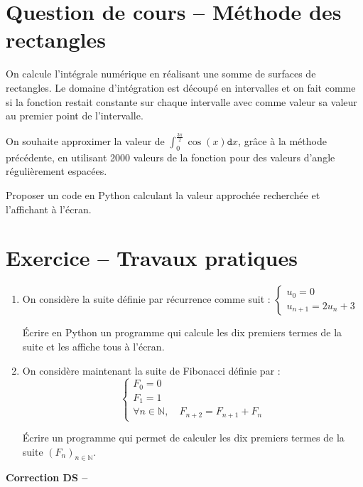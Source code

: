 \section{Question de cours -- Méthode des rectangles}

On calcule l'intégrale numérique en réalisant une somme de surfaces de rectangles. Le domaine d'intégration est découpé en intervalles et on fait comme si la fonction restait constante sur chaque intervalle avec comme valeur sa valeur au premier point de l'intervalle.

On souhaite approximer la valeur de $\displaystyle \int_0^\frac{3\pi}{2} \cos(x)\mathtt{d}x$, grâce à la méthode précédente, en utilisant 2000 valeurs de la fonction pour des valeurs d'angle régulièrement espacées.

Proposer un code en Python calculant la valeur approchée recherchée et l'affichant à l'écran.

\newpage 

\section{Exercice -- Travaux pratiques}

\begin{enumerate}
\item  On considère la suite définie par récurrence comme suit :
$\left\lbrace\begin{array}{l}
u_0=0\\
u_{n+1}=2u_n+3
\end{array}\right.$

Écrire en Python un programme qui calcule les dix premiers termes de la suite et les affiche tous à l'écran.

\item On considère maintenant la suite de Fibonacci définie par :
\[\left\lbrace\begin{array}{l}
F_0=0\\
F_1=1\\
\forall n\in\mathbb{N}, \quad F_{n+2}=F_{n+1}+F_n
\end{array}\right.\]

Écrire un programme qui permet de calculer les dix premiers termes de la suite $(F_n)_{n\in\mathbb{N}}$.
\end{enumerate}

\ifdef{\public}{}{}

\newpage 

\begin{center}
{\Large\bf Correction DS \no {\num} -- \descrip}
\end{center}

